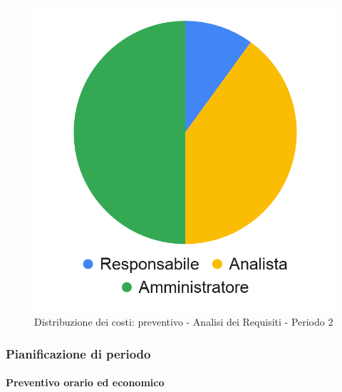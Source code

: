 \hspace{-1cm}
\begin{minipage}{.50\textwidth}
\smallPreventivoTable{
	
}
\end{minipage}
\hspace{1cm}
\begin{minipage}{.40\textwidth}
\begin{figure}[H]
	\includegraphics[scale=0.21]{res/images/charts/preventivo_priori/Grafico4-2.png}
	\caption{Distribuzione dei costi: preventivo - Analisi dei Requisiti - Periodo 2}
\end{figure}
\end{minipage} 


\subsubsection{Pianificazione di periodo}

\paragraph{Preventivo orario ed economico}
\subparagraph*{}

\contabilitaTable{
	
}


